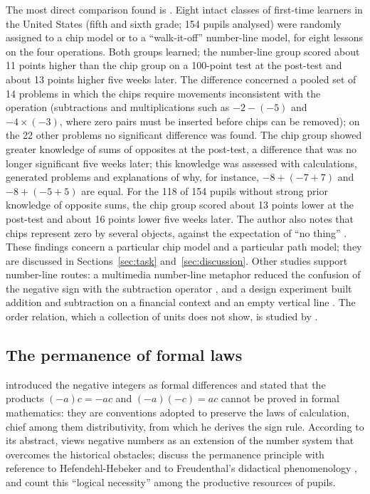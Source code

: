 \documentclass[11pt,a4paper]{article}
\theoremstyle{definition}
\begin{document}
The most direct comparison found is \citet{NurnbergerHaag2015PMENA}. Eight intact classes of first-time learners in the United States (fifth and sixth grade; 154 pupils analysed) were randomly assigned to a chip model or to a ``walk-it-off'' number-line model, for eight lessons on the four operations. Both groups learned; the number-line group scored about 11 points higher than the chip group on a 100-point test at the post-test and about 13 points higher five weeks later. The difference concerned a pooled set of 14 problems in which the chips require movements inconsistent with the operation (subtractions and multiplications such as $-2-(-5)$ and $-4\times(-3)$, where zero pairs must be inserted before chips can be removed); on the 22 other problems no significant difference was found. The chip group showed greater knowledge of sums of opposites at the post-test, a difference that was no longer significant five weeks later; this knowledge was assessed with calculations, generated problems and explanations of why, for instance, $-8+(-7+7)$ and $-8+(-5+5)$ are equal. For the 118 of 154 pupils without strong prior knowledge of opposite sums, the chip group scored about 13 points lower at the post-test and about 16 points lower five weeks later. The author also notes that chips represent zero by several objects, against the expectation of ``no thing'' \citep{NurnbergerHaag2015PMENA}. These findings concern a particular chip model and a particular path model; they are discussed in Sections~\ref{sec:task} and~\ref{sec:discussion}. Other studies support number-line routes: a multimedia number-line metaphor reduced the confusion of the negative sign with the subtraction operator \citep{MorenoMayer1999}, and a design experiment built addition and subtraction on a financial context and an empty vertical line \citep{StephanAkyuz2012}. The order relation, which a collection of units does not show, is studied by \citet{Schindler2017}.

\subsection{The permanence of formal laws}
\citet{Hankel1867} introduced the negative integers as formal differences and stated that the products $(-a)c=-ac$ and $(-a)(-c)=ac$ cannot be proved in formal mathematics: they are conventions adopted to preserve the laws of calculation, chief among them distributivity, from which he derives the sign rule. According to its abstract, \citet{HefendehlHebeker1991} views negative numbers as an extension of the number system that overcomes the historical obstacles; \citet{Bishop2014} discuss the permanence principle with reference to Hefendehl-Hebeker and to Freudenthal's didactical phenomenology \citep{Freudenthal1983}, and count this ``logical necessity'' among the productive resources of pupils.
\end{document}
